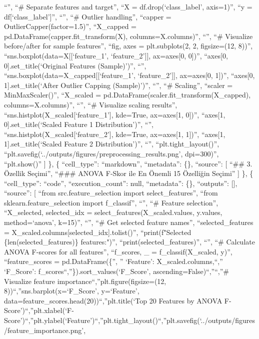 \documentclass[11pt]{article}
\begin{document}
``\n'', ``\# Separate features and target\n'', ``X =
df.drop(`class\_label', axis=1)\n'', ``y = df{[}`class\_label'{]}\n'',
``\n'', ``\# Outlier handling\n'', ``capper =
OutlierCapper(factor=1.5)\n'', ``X\_capped =
pd.DataFrame(capper.fit\_transform(X), columns=X.columns)\n'', ``\n'',
``\# Visualize before/after for sample features\n'', ``fig, axes =
plt.subplots(2, 2, figsize=(12, 8))\n'',
``sns.boxplot(data=X{[}{[}`feature\_1', `feature\_2'{]}{]}, ax=axes{[}0,
0{]})\n'', ``axes{[}0, 0{]}.set\_title(`Original Features
(Sample)')\n'', ``\n'', ``sns.boxplot(data=X\_capped{[}{[}`feature\_1',
`feature\_2'{]}{]}, ax=axes{[}0, 1{]})\n'', ``axes{[}0,
1{]}.set\_title(`After Outlier Capping (Sample)')\n'', ``\n'', ``\#
Scaling\n'', ``scaler = MinMaxScaler()\n'', ``X\_scaled =
pd.DataFrame(scaler.fit\_transform(X\_capped), columns=X.columns)\n'',
``\n'', ``\# Visualize scaling results\n'',
``sns.histplot(X\_scaled{[}`feature\_1'{]}, kde=True, ax=axes{[}1,
0{]})\n'', ``axes{[}1, 0{]}.set\_title(`Scaled Feature 1
Distribution')\n'', ``\n'', ``sns.histplot(X\_scaled{[}`feature\_2'{]},
kde=True, ax=axes{[}1, 1{]})\n'', ``axes{[}1, 1{]}.set\_title(`Scaled
Feature 2 Distribution')\n'', ``\n'', ``plt.tight\_layout()\n'',
``plt.savefig(`../outputs/figures/preprocessing\_results.png',
dpi=300)\n'', ``plt.show()'' {]} \}, \{ ``cell\_type'': ``markdown'',
``metadata'': \{\}, ``source'': {[} ``\#\# 3. Özellik Seçimi\n'',
``\#\#\# ANOVA F-Skor ile En Önemli 15 Özelliğin Seçimi'' {]} \}, \{
``cell\_type'': ``code'', ``execution\_count'': null, ``metadata'':
\{\}, ``outputs'': {[}{]}, ``source'': {[} ``from src.feature\_selection
import select\_features\n'', ``from sklearn.feature\_selection import
f\_classif\n'', ``\n'', ``\# Feature selection\n'', ``X\_selected,
selected\_idx = select\_features(X\_scaled.values, y.values,
method=`anova', k=15)\n'', ``\n'', ``\# Get selected feature names\n'',
``selected\_features =
X\_scaled.columns{[}selected\_idx{]}.tolist()\n'', ``print(f"Selected
\{len(selected\_features)\} features:")\n'',
``print(selected\_features)\n'', ``\n'', ``\# Calculate ANOVA F-scores
for all features\n'', ``f\_scores, \_ = f\_classif(X\_scaled, y)\n'',
``feature\_scores = pd.DataFrame(\{\n'', '' `Feature':
X\_scaled.columns,\n``,'' `F\_Score':
f\_scores\n``,''\}).sort\_values(`F\_Score',
ascending=False)\n``,''\n``,''\# Visualize feature
importance\n``,''plt.figure(figsize=(12,
8))\n``,''sns.barplot(x=`F\_Score', y=`Feature',
data=feature\_scores.head(20))\n``,''plt.title(`Top 20 Features by ANOVA
F-Score')\n``,''plt.xlabel(`F-Score')\n``,''plt.ylabel(`Feature')\n``,''plt.tight\_layout()\n``,''plt.savefig(`../outputs/figures/feature\_importance.png',
\end{document}
